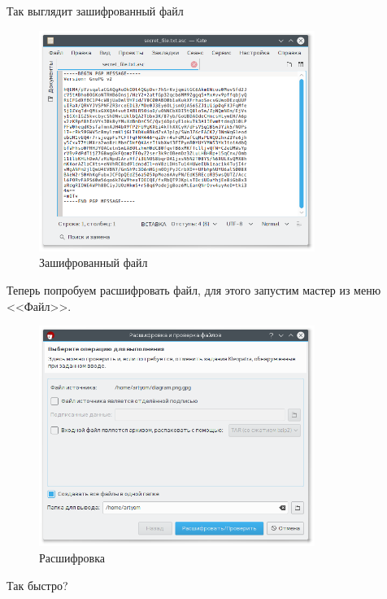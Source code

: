 Так выглядит зашифрованный файл

\begin{figure}[H]
	\centering
	\includegraphics[width=0.8\textwidth]{figures/screen14.png}
	\caption{Зашифрованный файл}
\end{figure}

Теперь попробуем расшифровать файл, для этого запустим мастер из меню <<Файл>>.

\begin{figure}[H]
	\centering
	\includegraphics[width=0.8\textwidth]{figures/screen15.png}
	\caption{Расшифровка}
\end{figure}

Так быстро?

